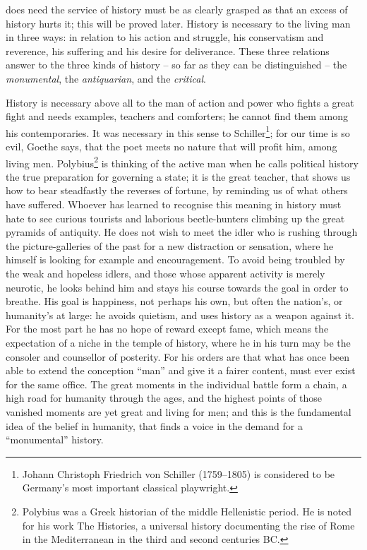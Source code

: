  does need the service of history must be as
clearly grasped as that an excess of history hurts it; this will be
proved later. History is necessary to the living man in three ways:
in relation to his action and struggle, his conservatism and
reverence, his suffering and his desire for deliverance. These three
relations answer to the three kinds of history -- so far as they can be
distinguished -- the \textit{monumental}, the \textit{antiquarian}, and the
\textit{critical}.

History is necessary above all to the man of action and power who
fights a great fight and needs examples, teachers and comforters; he
cannot find them among his contemporaries. It was necessary in this
sense to Schiller\footnote{Johann Christoph Friedrich von Schiller (1759–1805) is considered to be Germany's most important classical playwright.}; for our time is so evil, Goethe says, that the
poet meets no nature that will profit him, among living men. Polybius\footnote{Polybius  was a Greek historian of the middle Hellenistic period. He is noted for his work The Histories, a universal history documenting the rise of Rome in the Mediterranean in the third and second centuries BC.}
is thinking of the active man when he calls political history the
true preparation for governing a state; it is the great teacher, that
shows us how to bear steadfastly the reverses of fortune, by
reminding us of what others have suffered. Whoever has learned to
recognise this meaning in history must hate to see curious tourists
and laborious beetle-hunters climbing up the great pyramids of
antiquity. He does not wish to meet the idler who is rushing through
the picture-galleries of the past for a new distraction or sensation,
where he himself is looking for example and encouragement. To avoid
being troubled by the weak and hopeless idlers, and those whose
apparent activity is merely neurotic, he looks behind him and stays
his course towards the goal in order to breathe. His goal is
happiness, not perhaps his own, but often the nation's, or humanity's
at large: he avoids quietism, and uses history as a weapon against
it. For the most part he has no hope of reward except fame, which
means the expectation of a niche in the temple of history, where he
in his turn may be the consoler and counsellor of posterity. For his
orders are that what has once been able to extend the conception
\enquote{man} and give it a fairer content, must ever exist for the same
office. The great moments in the individual battle form a chain, a
high road for humanity through the ages, and the highest points of
those vanished moments are yet great and living for men; and this is
the fundamental idea of the belief in humanity, that finds a voice in
the demand for a \enquote{monumental} history.

